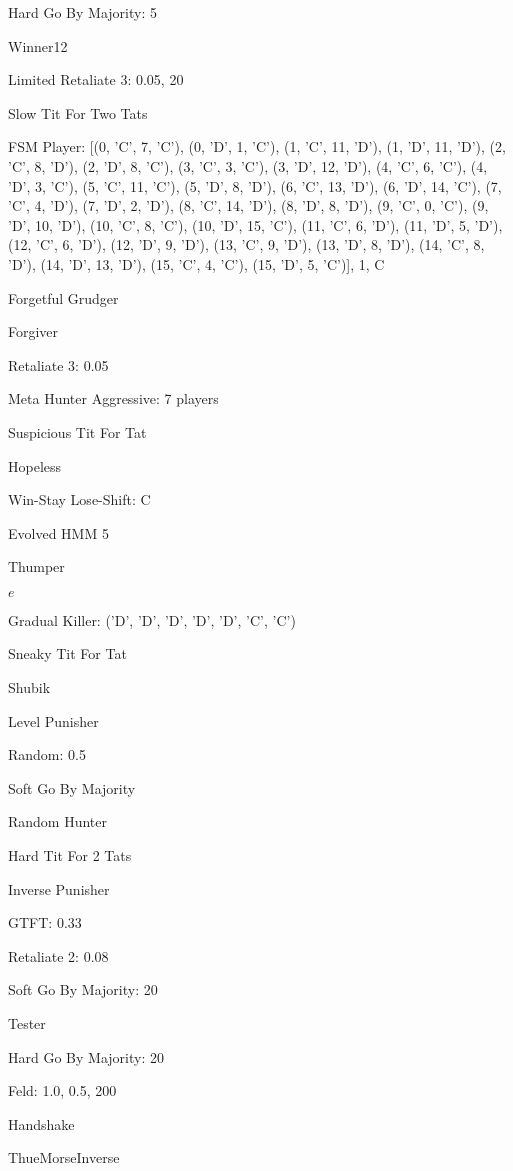 \item Hard Go By Majority: 5
\item Winner12
\item Limited Retaliate 3: 0.05, 20
\item Slow Tit For Two Tats
\item FSM Player: [(0, 'C', 7, 'C'), (0, 'D', 1, 'C'), (1, 'C', 11, 'D'), (1, 'D', 11, 'D'), (2, 'C', 8, 'D'), (2, 'D', 8, 'C'), (3, 'C', 3, 'C'), (3, 'D', 12, 'D'), (4, 'C', 6, 'C'), (4, 'D', 3, 'C'), (5, 'C', 11, 'C'), (5, 'D', 8, 'D'), (6, 'C', 13, 'D'), (6, 'D', 14, 'C'), (7, 'C', 4, 'D'), (7, 'D', 2, 'D'), (8, 'C', 14, 'D'), (8, 'D', 8, 'D'), (9, 'C', 0, 'C'), (9, 'D', 10, 'D'), (10, 'C', 8, 'C'), (10, 'D', 15, 'C'), (11, 'C', 6, 'D'), (11, 'D', 5, 'D'), (12, 'C', 6, 'D'), (12, 'D', 9, 'D'), (13, 'C', 9, 'D'), (13, 'D', 8, 'D'), (14, 'C', 8, 'D'), (14, 'D', 13, 'D'), (15, 'C', 4, 'C'), (15, 'D', 5, 'C')], 1, C
\item Forgetful Grudger
\item Forgiver
\item Retaliate 3: 0.05
\item Meta Hunter Aggressive: 7 players
\item Suspicious Tit For Tat
\item Hopeless
\item Win-Stay Lose-Shift: C
\item Evolved HMM 5
\item Thumper
\item $e$
\item Gradual Killer: ('D', 'D', 'D', 'D', 'D', 'C', 'C')
\item Sneaky Tit For Tat
\item Shubik
\item Level Punisher
\item Random: 0.5
\item Soft Go By Majority
\item Random Hunter
\item Hard Tit For 2 Tats
\item Inverse Punisher
\item GTFT: 0.33
\item Retaliate 2: 0.08
\item Soft Go By Majority: 20
\item Tester
\item Hard Go By Majority: 20
\item Feld: 1.0, 0.5, 200
\item Handshake
\item ThueMorseInverse
